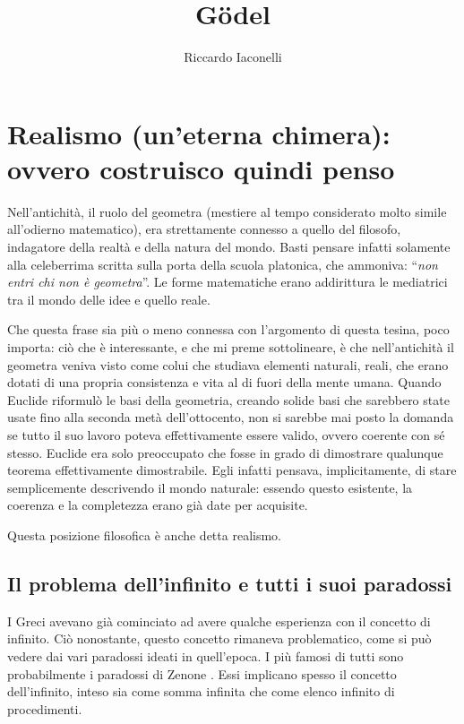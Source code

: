 \documentclass[a4paper,10pt]{article}
\title{Gödel}
\author{Riccardo Iaconelli}
\begin{document}
\maketitle

\cleardoublepage
\tableofcontents
\cleardoublepage
\section[Realismo (un'eterna chimera)]{Realismo (un'eterna chimera): ovvero costruisco quindi penso}
Nell'antichità, il ruolo del geometra (mestiere al tempo considerato molto simile all'odierno matematico), era strettamente connesso a quello del filosofo, indagatore della realtà e della natura del mondo. Basti pensare infatti solamente alla celeberrima scritta sulla porta della scuola platonica, che ammoniva: “\textit{non entri chi non è geometra}”. Le forme matematiche erano addirittura le mediatrici tra il mondo delle idee e quello reale.

Che questa frase sia più o meno connessa con l'argomento di questa tesina, poco importa: ciò che è interessante, e che mi preme sottolineare, è che nell'antichità il geometra veniva visto come colui che studiava elementi naturali, reali, che erano dotati di una propria consistenza e vita al di fuori della mente umana.
Quando Euclide riformulò le basi della geometria, creando solide basi che sarebbero state usate fino alla seconda metà dell'ottocento, non si sarebbe mai posto la domanda se tutto il suo lavoro poteva effettivamente essere valido, ovvero coerente con sé stesso. Euclide era solo preoccupato che fosse in grado di dimostrare qualunque teorema effettivamente dimostrabile. Egli infatti pensava, implicitamente, di stare semplicemente descrivendo il mondo naturale: essendo questo esistente, la coerenza e la completezza erano già date per acquisite.

Questa posizione filosofica è anche detta realismo.

\subsection{Il problema dell'infinito e tutti i suoi paradossi}

I Greci avevano già cominciato ad avere qualche esperienza con il concetto di infinito. Ciò nonostante, questo concetto rimaneva problematico, come si può vedere dai vari paradossi ideati in quell'epoca. I più famosi di tutti sono probabilmente i paradossi di Zenone
\cite{wp-paradossi-di-zenone}. Essi implicano spesso il concetto dell'infinito, inteso sia come somma infinita che come elenco infinito di procedimenti.
\end{document}
